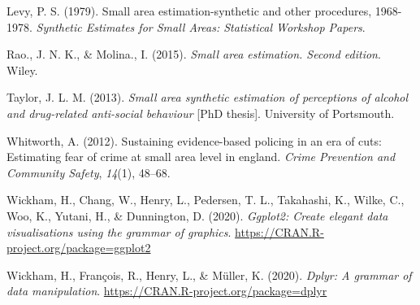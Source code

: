 \documentclass[
]{article}
\begin{document}
\leavevmode\hypertarget{ref-levy1979}{}%
Levy, P. S. (1979). Small area estimation-synthetic and other
procedures, 1968-1978. \emph{Synthetic Estimates for Small Areas:
Statistical Workshop Papers}.

\leavevmode\hypertarget{ref-rao2015}{}%
Rao., J. N. K., \& Molina., I. (2015). \emph{Small area estimation.
Second edition}. Wiley.

\leavevmode\hypertarget{ref-taylor2013}{}%
Taylor, J. L. M. (2013). \emph{Small area synthetic estimation of
perceptions of alcohol and drug-related anti-social behaviour}
{[}PhD thesis{]}. University of Portsmouth.

\leavevmode\hypertarget{ref-whitworth2012}{}%
Whitworth, A. (2012). Sustaining evidence-based policing in an era of
cuts: Estimating fear of crime at small area level in england.
\emph{Crime Prevention and Community Safety}, \emph{14}(1), 48--68.

\leavevmode\hypertarget{ref-wickham2020b}{}%
Wickham, H., Chang, W., Henry, L., Pedersen, T. L., Takahashi, K.,
Wilke, C., Woo, K., Yutani, H., \& Dunnington, D. (2020). \emph{Ggplot2:
Create elegant data visualisations using the grammar of graphics}.
\url{https://CRAN.R-project.org/package=ggplot2}

\leavevmode\hypertarget{ref-wickham2020}{}%
Wickham, H., François, R., Henry, L., \& Müller, K. (2020). \emph{Dplyr:
A grammar of data manipulation}.
\url{https://CRAN.R-project.org/package=dplyr}
\end{document}
